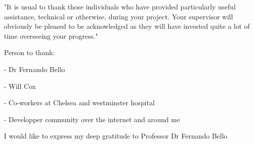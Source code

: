 "It is usual to thank those individuals who have provided particularly useful assistance, technical or otherwise, during your project. Your supervisor will obviously be pleased to be acknowledged as they will have invested quite a lot of time overseeing your progress."

Person to thank:

- Dr Fernando Bello

- Will Cox

- Co-workers at Chelsea and westminster hospital

- Developper community over the internet and around me 


I would like to express my deep gratitude to Professor Dr Fernando Bello